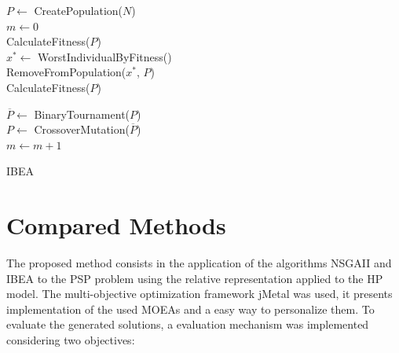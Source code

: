 \documentclass[conference]{IEEEtran}
\begin{document}
\begin{algorithm}[h]
	
	
	
	$P \gets$ CreatePopulation($N$)\\
	$m \gets 0$\\
	CalculateFitness($P$)\\ 	
	
	 {
		$x^* \gets$ WorstIndividualByFitness()\\
		RemoveFromPopulation($x^*$, $P$)\\
		CalculateFitness($P$)\\
	}
	
	
	$\overline P \gets$ BinaryTournament($P$)\\
	
	$P \gets$ CrossoverMutation($\overline P$)\\
	$m \gets m+1$

	\caption{IBEA}
	\label{alg:ibea}
\end{algorithm}




\section{Compared Methods} \label{sec:compared_methods}


The proposed method consists in the application of the algorithms NSGAII and IBEA to the PSP problem using the relative representation applied to the HP model. The multi-objective optimization framework jMetal \cite{jMetal} was used, it presents implementation of the used MOEAs and a easy way to personalize them. To evaluate the generated solutions, a evaluation mechanism was implemented considering two objectives:
\end{document}
